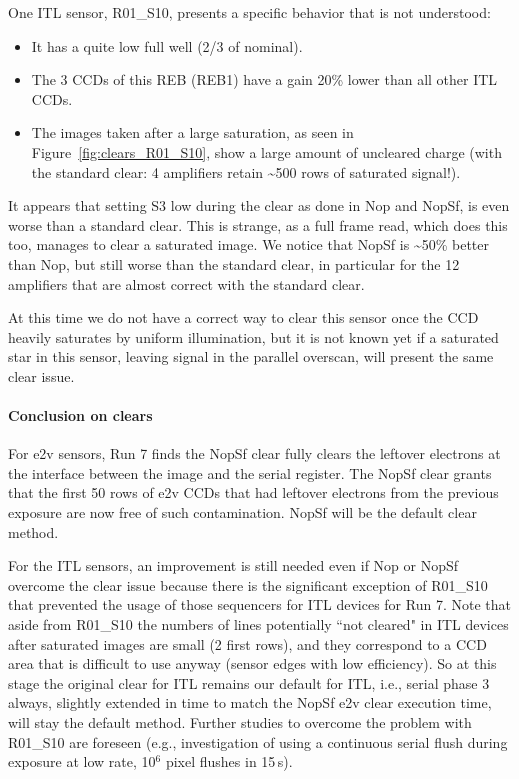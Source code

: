 
One ITL sensor, R01\_S10,
presents a specific behavior that is not understood:

\begin{itemize}
\tightlist
\item
  It has a quite low full well (2/3 of nominal).
\item
  The 3 CCDs of this REB (REB1) have a gain 20\% lower than all other ITL CCDs.
\item
  The images taken after a large saturation, as seen in Figure~\ref{fig:clears_R01_S10},
  show a large amount of uncleared charge (with the standard clear: 4
  amplifiers retain \textasciitilde500 rows of saturated signal!).
\end{itemize}

It appears that setting S3 low during the clear as done in Nop and NopSf,
is even worse than a standard clear. This is strange, as a full frame
read, which does this too, manages to clear a saturated image. We notice
that NopSf is \textasciitilde50\% better than Nop, but still worse than
the standard clear, in particular for the 12 amplifiers that are almost correct
with the standard clear.

At this time we do not have a correct way to clear this
sensor once the CCD heavily saturates by uniform illumination, but it is not
known yet if a saturated star in this sensor, leaving signal in the
parallel overscan, will present the same clear issue.

\paragraph{Conclusion on clears}\label{conclusion}
For e2v sensors, Run 7 finds the NopSf clear fully clears the leftover electrons at the interface between the image and the serial register.
The NopSf clear grants that the first 50 rows of e2v CCDs that had leftover electrons from the previous exposure are now free of such contamination. NopSf will be the default clear method.

For the ITL sensors, an improvement is still needed even if Nop or NopSf overcome the clear issue because there is the significant exception of R01\_S10 that prevented the usage of those sequencers for ITL devices for Run 7. Note that
aside from R01\_S10 the numbers of lines potentially
``not cleared" in ITL devices after saturated images are small (2 first rows), and they
correspond to a CCD area that is difficult to use anyway (sensor edges with low
efficiency). So at this stage the original clear for ITL remains our default
for ITL, i.e., serial phase 3 always, slightly extended in time to match the NopSf e2v clear execution time, will stay the default method.  Further studies to overcome the problem with
R01\_S10 are foreseen (e.g., investigation of using a continuous
serial flush during exposure at low rate, 10$^6$ pixel flushes in 15\,s).

